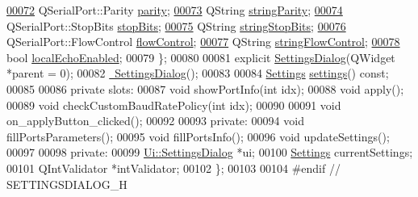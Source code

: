 \begin{DoxyCode}
\hypertarget{a00045_source_l00072}{}\hyperlink{a00022_ae08a00aa2e45218dade9046e3624cce7}{00072}         QSerialPort::Parity \hyperlink{a00022_ae08a00aa2e45218dade9046e3624cce7}{parity};
\hypertarget{a00045_source_l00073}{}\hyperlink{a00022_aa2c662b2fb315f038e827d63d83b059b}{00073}         QString \hyperlink{a00022_aa2c662b2fb315f038e827d63d83b059b}{stringParity};
\hypertarget{a00045_source_l00074}{}\hyperlink{a00022_ab88ff384f7c1127bcbe2dd97b49696a4}{00074}         QSerialPort::StopBits \hyperlink{a00022_ab88ff384f7c1127bcbe2dd97b49696a4}{stopBits};
\hypertarget{a00045_source_l00075}{}\hyperlink{a00022_abde3c8410f779688ce6c2fcbbbb84f10}{00075}         QString \hyperlink{a00022_abde3c8410f779688ce6c2fcbbbb84f10}{stringStopBits};
\hypertarget{a00045_source_l00076}{}\hyperlink{a00022_aa962a6e7dbb8338af154305e4ff46cfc}{00076}         QSerialPort::FlowControl \hyperlink{a00022_aa962a6e7dbb8338af154305e4ff46cfc}{flowControl};
\hypertarget{a00045_source_l00077}{}\hyperlink{a00022_a1b0a388ec5059bd2628acf9b7728f2f3}{00077}         QString \hyperlink{a00022_a1b0a388ec5059bd2628acf9b7728f2f3}{stringFlowControl};
\hypertarget{a00045_source_l00078}{}\hyperlink{a00022_ae1bfec3d6530f9791451d12aacfcb014}{00078}         \textcolor{keywordtype}{bool} \hyperlink{a00022_ae1bfec3d6530f9791451d12aacfcb014}{localEchoEnabled};
00079     \};
00080 
00081     \textcolor{keyword}{explicit} \hyperlink{a00022_abf4568621eef32ca85b919f2209cdc42}{SettingsDialog}(QWidget *parent = 0);
00082     \hyperlink{a00022_ac48f54d4472902be0a3845a69167f068}{~SettingsDialog}();
00083 
00084     \hyperlink{a00022_dc/dfe/a00125}{Settings} \hyperlink{a00022_afeb533d711d0392b9856c63b40b65ad7}{settings}() \textcolor{keyword}{const};
00085 
00086 \textcolor{keyword}{private} slots:
00087     \textcolor{keywordtype}{void} showPortInfo(\textcolor{keywordtype}{int} idx);
00088     \textcolor{keywordtype}{void} apply();
00089     \textcolor{keywordtype}{void} checkCustomBaudRatePolicy(\textcolor{keywordtype}{int} idx);
00090 
00091     \textcolor{keywordtype}{void} on\_applyButton\_clicked();
00092 
00093 \textcolor{keyword}{private}:
00094     \textcolor{keywordtype}{void} fillPortsParameters();
00095     \textcolor{keywordtype}{void} fillPortsInfo();
00096     \textcolor{keywordtype}{void} updateSettings();
00097 
00098 \textcolor{keyword}{private}:
00099     \hyperlink{a00023}{Ui::SettingsDialog} *ui;
00100     \hyperlink{a00022_dc/dfe/a00125}{Settings} currentSettings;
00101     QIntValidator *intValidator;
00102 \};
00103 
00104 \textcolor{preprocessor}{#endif // SETTINGSDIALOG\_H}
\end{DoxyCode}
